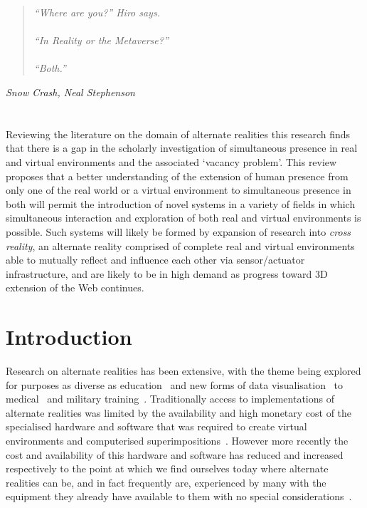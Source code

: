 \begin{quote}
\textit{
``Where are you?'' Hiro says.
\\
\\
``In Reality or the Metaverse?''
\\
\\
``Both.''}
\end{quote}
\hfill \textit{Snow Crash, Neal Stephenson}
\\
\\
\\
Reviewing the literature on the domain of alternate realities this research finds that there is a gap in the scholarly investigation of simultaneous presence in real and virtual environments and the associated `vacancy problem'. This review proposes that a better understanding of the extension of human presence from only one of the real world or a virtual environment to simultaneous presence in both will permit the introduction of novel systems in a variety of fields in which simultaneous interaction and exploration of both real and virtual environments is possible. Such systems will likely be formed by expansion of research into \textit{cross reality}, an alternate reality comprised of complete real and virtual environments able to mutually reflect and influence each other via sensor/actuator infrastructure, and are likely to be in high demand as progress toward 3D extension of the Web continues.

\section{Introduction}
Research on alternate realities has been extensive, with the theme being explored for purposes as diverse as education~\cite{Warburton2009} and new forms of data visualisation~\cite{Coleman2009} to medical~\cite{TenEyck2011} and military training~\cite{Qiu2009}. Traditionally access to implementations of alternate realities was limited by the availability and high monetary cost of the specialised hardware and software that was required to create virtual environments and computerised superimpositions~\cite{Druck2006}. However more recently the cost and availability of this hardware and software has reduced and increased respectively to the point at which we find ourselves today where alternate realities can be, and in fact frequently are, experienced by many with the equipment they already have available to them with no special considerations~\cite{Sevan2008}.

